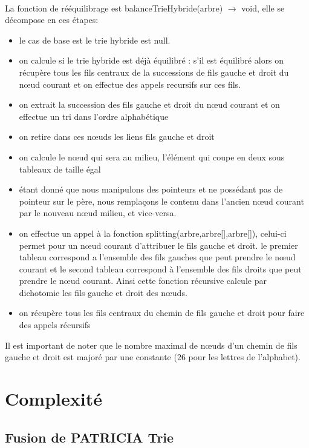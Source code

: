 \documentclass[a4paper,12pt]{report}
\begin{document}
\paragraph{}
La fonction de rééquilibrage est balanceTrieHybride(arbre) $\rightarrow$ void, elle se décompose en ces étapes:
\begin{itemize}
 \item le cas de base est le trie hybride est null.
 \item on calcule si le trie hybride est déjà équilibré : s'il est équilibré alors on récupère tous les fils centraux de la
 successions de fils gauche et droit du nœud courant et on effectue des appels recursifs sur ces fils.
 \item on extrait la succession des fils gauche et droit du nœud courant et on effectue un tri dans l'ordre alphabétique
 \item on retire dans ces nœuds les liens fils gauche et droit
 \item on calcule le nœud qui sera au milieu, l'élément qui coupe en deux sous tableaux de taille égal
 \item étant donné que nous manipulons des pointeurs et ne possédant pas de pointeur sur le père, nous remplaçons le contenu
 dans l'ancien nœud courant par le nouveau nœud milieu, et vice-versa.
 \item on effectue un appel à la fonction splitting(arbre,arbre[],arbre[]), celui-ci permet pour un nœud courant d'attribuer le
 fils gauche et droit. le premier tableau correspond a l'ensemble des fils gauches que peut prendre le nœud courant et le second
 tableau correspond à l'ensemble des fils droits que peut prendre le nœud courant. Ainsi cette fonction récursive calcule par
 dichotomie les fils gauche et droit des nœuds.
 \item on récupère tous les fils centraux du chemin de fils gauche et droit pour faire des appels récursifs
\end{itemize}
Il est important de noter que le nombre maximal de nœuds d'un chemin de fils gauche et droit est majoré par une constante (26
pour les lettres de l'alphabet).

\section{Complexité}
\subsection{Fusion de PATRICIA Trie}
\end{document}
